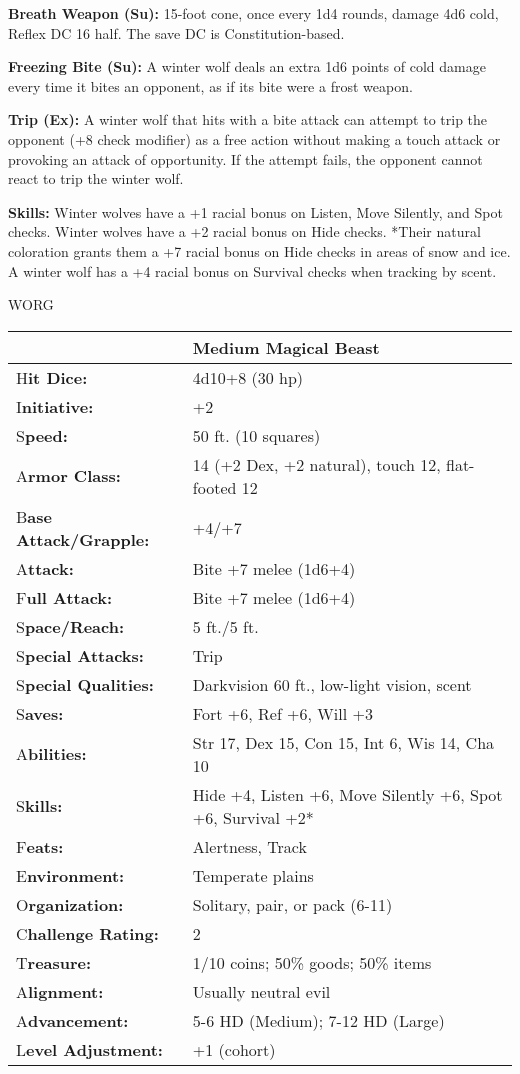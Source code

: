 \documentclass{article}
\begin{document}
\textbf{Breath Weapon (Su):} 15-foot cone, once every 1d4 rounds, damage 4d6 cold, 
Reflex DC 16 half. The save DC is Constitution-based. 

\textbf{Freezing Bite (Su):} A winter wolf deals an extra 1d6 points of cold damage 
every time it bites an opponent, as if its bite were a frost weapon.

\textbf{Trip (Ex): }A winter wolf that hits with a bite attack can attempt to trip 
the opponent (+8 check modifier) as a free action without making a touch attack 
or provoking an attack of opportunity. If the attempt fails, the opponent cannot 
react to trip the winter wolf.

\textbf{Skills: }Winter wolves have a +1 racial bonus on Listen, Move Silently, 
and Spot checks. Winter wolves have a +2 racial bonus on Hide checks. *Their natural 
coloration grants them a +7 racial bonus on Hide checks in areas of snow and ice. 
A winter wolf has a +4 racial bonus on Survival checks when tracking by scent.

\vspace{12pt}
{\LARGE{}WORG}

\begin{tabular}{|>{\raggedright}p{89pt}|>{\raggedright}p{236pt}|}
\hline
  & Medium Magical Beast\tabularnewline
\hline
H\textbf{it Dice:} & 4d10+8 (30 hp)\tabularnewline
\hline
I\textbf{nitiative:} & +2\tabularnewline
\hline
S\textbf{peed:} & 50 ft. (10 squares)\tabularnewline
\hline
A\textbf{rmor Class:} & 14 (+2 Dex, +2 natural), touch 12, flat-footed 12\tabularnewline
\hline
B\textbf{ase Attack/Grapple:} & +4/+7\tabularnewline
\hline
A\textbf{ttack:} & Bite +7 melee (1d6+4)\tabularnewline
\hline
F\textbf{ull Attack:} & Bite +7 melee (1d6+4)\tabularnewline
\hline
S\textbf{pace/Reach:} & 5 ft./5 ft.\tabularnewline
\hline
S\textbf{pecial Attacks:} & Trip\tabularnewline
\hline
S\textbf{pecial Qualities:} & Darkvision 60 ft., low-light vision, scent\tabularnewline
\hline
S\textbf{aves:} & Fort +6, Ref +6, Will +3\tabularnewline
\hline
A\textbf{bilities:} & Str 17, Dex 15, Con 15, Int 6, Wis 14, Cha 10\tabularnewline
\hline
S\textbf{kills:} & Hide +4, Listen +6, Move Silently +6, Spot +6, Survival +2*\tabularnewline
\hline
F\textbf{eats:} & Alertness, Track\tabularnewline
\hline
E\textbf{nvironment:} & Temperate plains\tabularnewline
\hline
O\textbf{rganization:} & Solitary, pair, or pack (6-11)\tabularnewline
\hline
C\textbf{hallenge Rating:} & 2\tabularnewline
\hline
T\textbf{reasure:} & 1/10 coins; 50\% goods; 50\% items\tabularnewline
\hline
A\textbf{lignment:} & Usually neutral evil\tabularnewline
\hline
A\textbf{dvancement:} & 5-6 HD (Medium); 7-12 HD (Large)\tabularnewline
\hline
L\textbf{evel Adjustment:} & +1 (cohort)\tabularnewline
\hline
\end{tabular}
\end{document}
